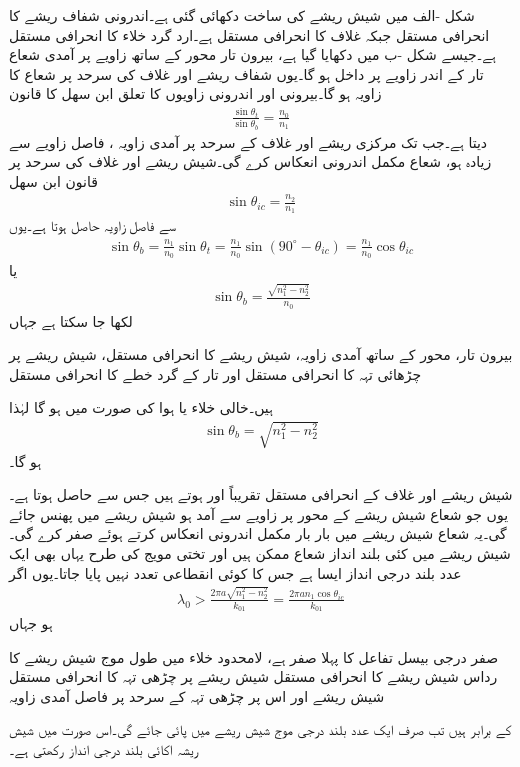 شکل -الف میں شیش ریشے کی ساخت دکھائی گئی ہے۔اندرونی شفاف ریشے کا انحرافی مستقل  جبکہ غلاف کا انحرافی مستقل  ہے۔ارد گرد خلاء کا انحرافی مستقل  ہے۔جیسے شکل -ب میں دکھایا گیا ہے، بیرون تار محور کے ساتھ  زاویے پر آمدی شعاع تار کے اندر  زاویے پر داخل ہو گا۔یوں شفاف ریشے اور غلاف کی سرحد پر شعاع کا زاویہ  ہو گا۔بیرونی اور اندرونی زاویوں کا تعلق ابن سھل کا قانون
\begin{align}
\frac{\sin \theta_t}{\sin \theta_b}=\frac{n_0}{n_1}
\end{align}
دیتا ہے۔جب تک مرکزی ریشے اور غلاف کے سرحد پر آمدی زاویہ ، فاصل زاویے  سے زیادہ ہو، شعاع مکمل اندرونی انعکاس کرے گی۔شیش ریشے اور غلاف کی سرحد پر قانون ابن سھل
\begin{align}
\sin{\theta_{ic}}=\frac{n_2}{n_1}
\end{align}
 سے فاصل زاویہ  حاصل ہوتا ہے۔یوں
\begin{align*}
\sin \theta_b=\frac{n_1}{n_0} \sin \theta_t =\frac{n_1}{n_0} \sin(90^{\circ}-\theta_{ic})=\frac{n_1}{n_0} \cos \theta_{ic}
\end{align*}
یا
\begin{align}
\sin \theta_b=\frac{\sqrt{n_1^2-n_2^2}}{n_0}
\end{align}
لکھا جا سکتا ہے جہاں
\begin{description}
 بیرون تار، محور کے ساتھ آمدی زاویہ،
 شیش ریشے کا انحرافی مستقل،
 شیش ریشے پر چڑھائی تہہ کا انحرافی مستقل اور
 تار کے گرد خطے کا انحرافی مستقل
\end{description}
ہیں۔خالی خلاء یا ہوا کی صورت میں  ہو گا لہٰذا
\begin{align}
\sin \theta_b=\sqrt{n_1^2-n_2^2}
\end{align}
ہو گا۔

شیش ریشے اور غلاف کے انحرافی مستقل تقریباً  اور  ہوتے ہیں جس سے  حاصل ہوتا ہے۔یوں جو شعاع شیش ریشے کے محور پر  زاویے سے آمد ہو شیش ریشے میں پھنس جائے گی۔یہ شعاع شیش ریشے میں بار بار مکمل اندرونی انعکاس کرتے ہوئے صفر کرے گی۔شیش ریشے میں کئی بلند انداز شعاع ممکن ہیں اور تختی مویج کی طرح یہاں بھی ایک عدد بلند درجی انداز ایسا ہے جس کا کوئی انقطاعی تعدد نہیں پایا جاتا۔یوں اگر
\begin{align}
\lambda_0>\frac{2\pi a \sqrt{n_1^2-n_2^2}}{k_{01}}=\frac{2\pi a n_1 \cos \theta_{ic}}{k_{01}}
\end{align}
ہو جہاں
\begin{description}
 صفر درجی بیسل تفاعل  کا پہلا صفر  ہے،
 لامحدود خلاء میں طول موج
 شیش ریشے کا رداس
 شیش ریشے کا انحرافی مستقل
 شیش ریشے پر چڑھی تہہ کا انحرافی مستقل
 شیش ریشے اور اس پر چڑھی تہہ کے سرحد پر فاصل آمدی زاویہ
\end{description}
کے برابر ہیں تب صرف ایک عدد بلند درجی موج شیش ریشے میں پائی جائے گی۔اس صورت میں شیش ریشہ اکائی بلند درجی انداز رکھتی ہے۔

